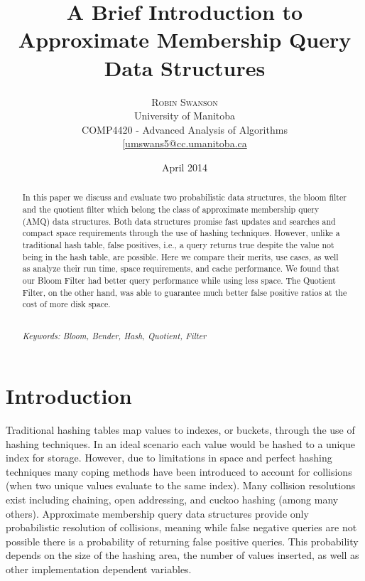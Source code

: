 \documentclass[twoside]{article}
\title{\vspace{-15mm}\fontsize{24pt}{10pt}\selectfont\textbf{A Brief Introduction to Approximate Membership Query Data Structures}}
\author{
\large
\textsc{Robin Swanson}\\[2mm]
\normalsize University of Manitoba \\ \normalsize COMP4420 - Advanced Analysis of Algorithms \\
\normalsize \href{mailto:umswans5@cc.umanitoba.ca}{[umswans5@cc.umanitoba.ca}
}
\date{April 2014}
\begin{document}
\maketitle %

\thispagestyle{fancy} %


\begin{abstract}
\noindent 
In this paper we discuss and evaluate two probabilistic data structures, the bloom filter and the quotient filter which belong the class of approximate membership query (AMQ) data structures. Both data structures promise fast updates and searches and compact space requirements through the use of hashing techniques. However, unlike a traditional hash table, false positives, i.e., a query returns true despite the value not being in the hash table, are possible. Here we compare their merits, use cases, as well as analyze their run time, space requirements, and cache performance. We found that our Bloom Filter had better query performance while using less space. The Quotient Filter, on the other hand, was able to guarantee much better false positive ratios at the cost of more disk space.

\noindent
\emph{\\ Keywords: Bloom, Bender, Hash, Quotient, Filter}
\end{abstract}


\section{Introduction}

Traditional hashing tables map values to indexes, or buckets, through the use of hashing techniques. In an ideal scenario each value would be hashed to a unique index for storage. However, due to limitations in space and perfect hashing techniques many coping methods have been introduced to account for collisions (when two unique values evaluate to the same index). Many collision resolutions exist including chaining, open addressing, and cuckoo hashing (among many others). Approximate membership query data structures provide only probabilistic resolution of collisions, meaning while false negative queries are not possible there is a probability of returning false positive queries. This probability depends on the size of the hashing area, the number of values inserted, as well as other implementation dependent variables.
\end{document}
